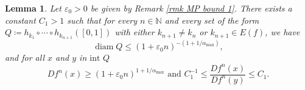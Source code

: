 \documentclass[12pt]{amsart}
\numberwithin{equation}{section} %
\numberwithin{figure}{section} %
\theoremstyle{plain}
\newtheorem{lemm}[prop]{Lemma}
\theoremstyle{definition}
\theoremstyle{remark}
\theoremstyle{citing}
\newcommand{\N}{\mathbb{N}}
\renewcommand{\=}{\coloneqq}
\DeclareMathOperator{\diam}{diam}
\begin{document}
\begin{lemm}\label{lemma bound Df^n}
Let $\varepsilon_0>0$ be given by Remark \ref{rmk MP bound 1}. There exists a constant $C_1>1$ such that for every $n\in \N$ and every set of the form $Q\=h_{k_1}\circ\cdots\circ h_{k_{n+1}}([0,1])$ with either $k_{n+1}\neq k_{n}$ or $k_{n+1}\in E(f)$, we have
    \begin{equation}\label{distortion eq 1}
         \diam Q \leq (1+\varepsilon_0 n)^{-(1 + 1/\alpha_{\max})},
    \end{equation}
    and for all $x$ and $y$ in $\text{int }Q$
    \begin{equation}\label{distortion eq 2}
     Df^n(x) \geq (1+\varepsilon_0 n)^{1+1/\alpha_{\max}} \text{ and } C_1^{-1}\leq \frac{Df^n(x)}{Df^n(y)}\leq C_1.
    \end{equation}
    \end{lemm}
\end{document}
